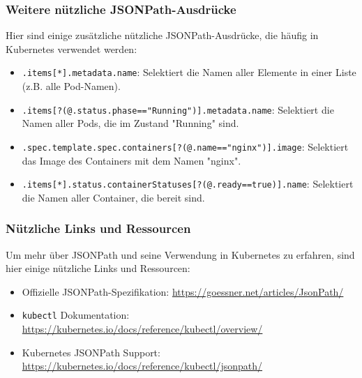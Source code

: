 \subsubsection{Weitere nützliche JSONPath-Ausdrücke}
Hier sind einige zusätzliche nützliche JSONPath-Ausdrücke, die häufig in Kubernetes verwendet werden:

\begin{itemize}
    \item \texttt{.items[*].metadata.name}: Selektiert die Namen aller Elemente in einer Liste (z.B. alle Pod-Namen).
    \item \texttt{.items[?(@.status.phase=="Running")].metadata.name}: Selektiert die Namen aller Pods, die im Zustand "Running" sind.
    \item \texttt{.spec.template.spec.containers[?(@.name=="nginx")].image}: Selektiert das Image des Containers mit dem Namen "nginx".
    \item \texttt{.items[*].status.containerStatuses[?(@.ready==true)].name}: Selektiert die Namen aller Container, die bereit sind.
\end{itemize}

\subsubsection{Nützliche Links und Ressourcen}
Um mehr über JSONPath und seine Verwendung in Kubernetes zu erfahren, sind hier einige nützliche Links und Ressourcen:

\begin{itemize}
    \item Offizielle JSONPath-Spezifikation: \url{https://goessner.net/articles/JsonPath/}
    \item \texttt{kubectl} Dokumentation: \url{https://kubernetes.io/docs/reference/kubectl/overview/}
    \item Kubernetes JSONPath Support: \url{https://kubernetes.io/docs/reference/kubectl/jsonpath/}
\end{itemize}